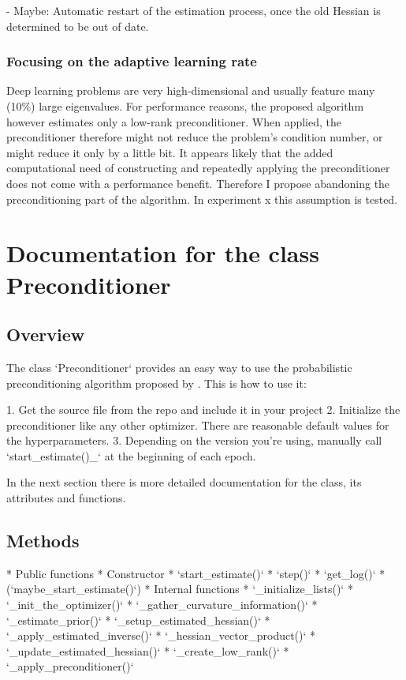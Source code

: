\documentclass[twoside,12pt,a4paper]{report}
\begin{document}
- Maybe: Automatic restart of the estimation process, once the old Hessian is determined to be out of date.

\subsubsection{Focusing on the adaptive learning rate}
Deep learning problems are very high-dimensional and usually feature many (10\%) large eigenvalues. For performance reasons, the proposed algorithm however estimates only a low-rank preconditioner. When applied, the preconditioner therefore might not reduce the problem's condition number, or might reduce it only by a little bit. It appears likely that the added computational need of constructing and repeatedly applying the preconditioner does not come with a performance benefit. Therefore I propose abandoning the preconditioning part of the algorithm. In experiment x  this assumption is tested.

\section{Documentation for the class Preconditioner}
\subsection{Overview}
\begin{markdown}
The class `Preconditioner` provides an easy way to use the probabilistic preconditioning algorithm proposed by \cite{de2019active}.
This is how to use it:

1. Get the source file from the repo and include it in your project
2. Initialize the preconditioner like any other optimizer. There are reasonable default values for the hyperparameters.
3. Depending on the version you're using, manually call `start_estimate()_` at the beginning of each epoch.

In the next section there is more detailed documentation for the class, its attributes and functions.
\end{markdown}

\subsection{Methods}
\begin{markdown}
* Public functions
	* Constructor
	* `start_estimate()`
	* `step()`
	* `get_log()`
	* (`maybe_start_estimate()`)
* Internal functions
	* `_initialize_lists()`
	* `_init_the_optimizer()`
	* `_gather_curvature_information()`
	* `_estimate_prior()`
	* `_setup_estimated_hessian()`
	* `_apply_estimated_inverse()`
	* `_hessian_vector_product()`
	* `_update_estimated_hessian()`
	* `_create_low_rank()`
	* `_apply_preconditioner()`
	
\end{markdown}
\end{document}
